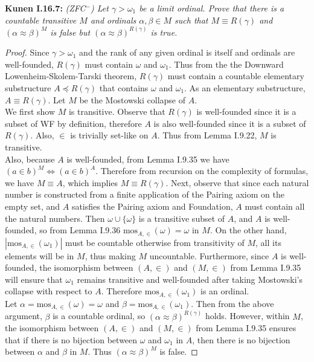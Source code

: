 \documentclass{article}
\begin{document}
\textbf{Kunen I.16.7:} \it (ZFC$^-$) Let $\gamma>\omega_1$ be a limit
  ordinal. Prove that there is a countable transitive $M$ and ordinals
  $\alpha,\beta\in M$ such that $M\equiv R(\gamma)$ and
  $(\alpha\approx\beta)^M$ is false but $(\alpha\approx\beta)^{R(\gamma)}$
  is true.

  \begin{proof}
    Since $\gamma>\omega_1$ and the rank of any given ordinal is itself and
    ordinals are well-founded, $R(\gamma)$ must contain $\omega$ and
    $\omega_1$. Thus from the the Downward Lowenheim-Skolem-Tarski theorem,
    $R(\gamma)$ must contain a countable elementary substructure $A\preceq
    R(\gamma)$ that contains $\omega$ and $\omega_1$. As an elementary
    substructure, $A\equiv R(\gamma)$. Let $M$ be the Mostowski collapse of
    $A$. \\

    We first show $M$ is transitive. Observe that $R(\gamma)$ is
    well-founded since it is a subset of WF by definition, therefore $A$ is
    also well-founded since it is a subset of $R(\gamma)$. Also, $\in$ is
    trivially set-like on $A$. Thus from Lemma I.9.22, $M$ is
    transitive. \\

    Also, because $A$ is well-founded, from Lemma I.9.35 we have $(a\in
    b)^M \Leftrightarrow (a\in b)^A$. Therefore from recursion on the
    complexity of formulas, we have $M\equiv A$, which implies
    $M\equiv R(\gamma)$. Next, observe that since each natural number is
    constructed from a finite application of the Pairing axiom on the empty
    set, and $A$ satisfies the Pairing axiom and Foundation, $A$ must
    contain all the natural numbers. Then $\omega\cup\{\omega\}$ is a
    transitive subset of $A$, and $A$ is well-founded, so from Lemma I.9.36
    $\text{mos}_{A,\in}(\omega)=\omega$ in $M$. On the other hand,
    $|\text{mos}_{A,\in}(\omega_1)|$ must be countable otherwise from
    transitivity of $M$, all its elements will be in $M$, thus making $M$
    uncountable. Furthermore, since $A$ is well-founded, the isomorphism
    between $(A,\in)$ and $(M,\in)$ from Lemma I.9.35 will ensure that
    $\omega_1$ remains transitive and well-founded after taking Mostowski's
    collapse with respect to $A$. Therefore $\text{mos}_{A,\in}(\omega_1)$
    is an ordinal. \\

    Let $\alpha=\text{mos}_{A,\in}(\omega)=\omega$ and
    $\beta=\text{mos}_{A,\in}(\omega_1)$. Then from the above argument,
    $\beta$ is a countable ordinal, so $(\alpha\approx\beta)^{R(\gamma)}$
    holds. However, within $M$, the isomorphism between $(A,\in)$ and
    $(M,\in)$ from Lemma I.9.35 ensures that if there is no bijection
    between $\omega$ and $\omega_1$ in $A$, then there is no bijection
    between $\alpha$ and $\beta$ in $M$. Thus
    $(\alpha\approx\beta)^{M}$ is false.
  \end{proof}
\end{document}
